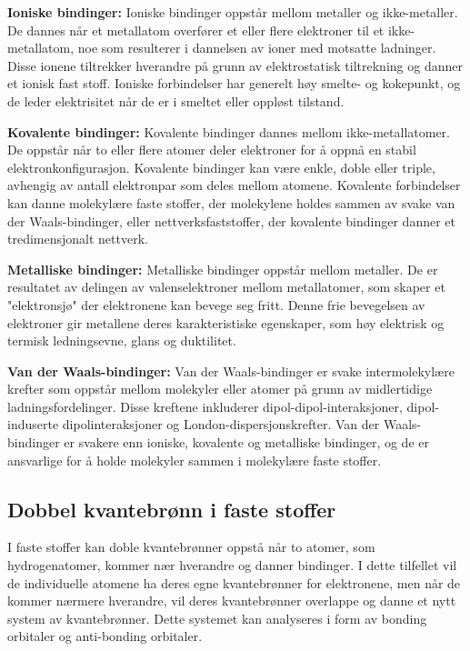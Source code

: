\textbf{Ioniske bindinger:} Ioniske bindinger oppstår mellom metaller og ikke-metaller. De dannes når et metallatom overfører et eller flere elektroner til et ikke-metallatom, noe som resulterer i dannelsen av ioner med motsatte ladninger. Disse ionene tiltrekker hverandre på grunn av elektrostatisk tiltrekning og danner et ionisk fast stoff. Ioniske forbindelser har generelt høy smelte- og kokepunkt, og de leder elektrisitet når de er i smeltet eller oppløst tilstand.

\textbf{Kovalente bindinger:} Kovalente bindinger dannes mellom ikke-metallatomer. De oppstår når to eller flere atomer deler elektroner for å oppnå en stabil elektronkonfigurasjon. Kovalente bindinger kan være enkle, doble eller triple, avhengig av antall elektronpar som deles mellom atomene. Kovalente forbindelser kan danne molekylære faste stoffer, der molekylene holdes sammen av svake van der Waals-bindinger, eller nettverksfaststoffer, der kovalente bindinger danner et tredimensjonalt nettverk.

\textbf{Metalliske bindinger:} Metalliske bindinger oppstår mellom metaller. De er resultatet av delingen av valenselektroner mellom metallatomer, som skaper et "elektronsjø" der elektronene kan bevege seg fritt. Denne frie bevegelsen av elektroner gir metallene deres karakteristiske egenskaper, som høy elektrisk og termisk ledningsevne, glans og duktilitet.

\textbf{Van der Waals-bindinger:} Van der Waals-bindinger er svake intermolekylære krefter som oppstår mellom molekyler eller atomer på grunn av midlertidige ladningsfordelinger. Disse kreftene inkluderer dipol-dipol-interaksjoner, dipol-induserte dipolinteraksjoner og London-dispersjonskrefter. Van der Waals-bindinger er svakere enn ioniske, kovalente og metalliske bindinger, og de er ansvarlige for å holde molekyler sammen i molekylære faste stoffer.

\subsection*{Dobbel kvantebrønn i faste stoffer}

I faste stoffer kan doble kvantebrønner oppstå når to atomer, som hydrogenatomer, kommer nær hverandre og danner bindinger. I dette tilfellet vil de individuelle atomene ha deres egne kvantebrønner for elektronene, men når de kommer nærmere hverandre, vil deres kvantebrønner overlappe og danne et nytt system av kvantebrønner. Dette systemet kan analyseres i form av bonding orbitaler og anti-bonding orbitaler.

